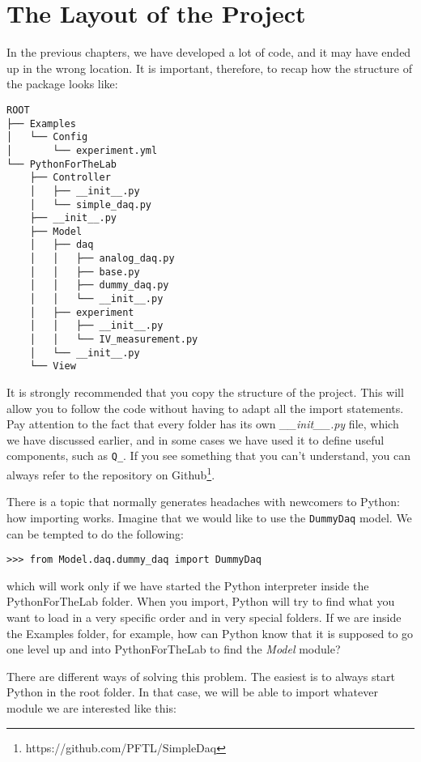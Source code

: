 \section{The Layout of the Project}\label{the-layout-of-theproject}
In the previous chapters, we have developed a lot of code, and it may have ended up in the wrong location. It is important, therefore, to recap  how the structure of the package looks like:

\begin{verbatim}
ROOT
├── Examples
│   └── Config
│       └── experiment.yml
└── PythonForTheLab
    ├── Controller
    │   ├── __init__.py
    │   └── simple_daq.py
    ├── __init__.py
    ├── Model
    │   ├── daq
    │   │   ├── analog_daq.py
    │   │   ├── base.py
    │   │   ├── dummy_daq.py
    │   │   └── __init__.py
    │   ├── experiment
    │   │   ├── __init__.py
    │   │   └── IV_measurement.py
    │   └── __init__.py
    └── View
\end{verbatim}

It is strongly recommended that you copy the structure of the project. This will allow you to follow the code without having to adapt all the import statements. Pay attention to the fact that every folder has its own \emph{\_\_init\_\_.py} file, which we have discussed earlier, and in some cases we have used it to define useful components, such as \texttt{Q\_}. If you see something that you can't understand, you can always refer to the repository on Github\footnote{https://github.com/PFTL/SimpleDaq}.

There is a topic that normally generates headaches with newcomers to Python: how importing works. Imagine that we would like to use the \texttt{DummyDaq} model. We can be tempted to do the following: 

\begin{verbatim}
>>> from Model.daq.dummy_daq import DummyDaq
\end{verbatim}

which will work only if we have started the Python interpreter inside the PythonForTheLab folder. When you import, Python will try to find what you want to load in a very specific order and in very special folders. If we are inside the Examples folder, for example, how can Python know that it is supposed to go one level up and into PythonForTheLab to find the \emph{Model} module? 

There are different ways of solving this problem. The easiest is to always start Python in the root folder. In that case, we will be able to import whatever module we are interested like this:

